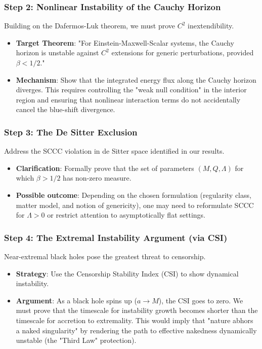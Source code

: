 \documentclass[12pt,a4paper]{article}
\begin{document}
\subsubsection{Step 2: Nonlinear Instability of the Cauchy Horizon}
Building on the Dafermos-Luk theorem, we must prove $C^2$ inextendibility.
\begin{itemize}
    \item \textbf{Target Theorem}: "For Einstein-Maxwell-Scalar systems, the Cauchy horizon is unstable against $C^2$ extensions for generic perturbations, provided $\beta < 1/2$."
    \item \textbf{Mechanism}: Show that the integrated energy flux along the Cauchy horizon diverges. This requires controlling the "weak null condition" in the interior region and ensuring that nonlinear interaction terms do not accidentally cancel the blue-shift divergence.
\end{itemize}

\subsubsection{Step 3: The De Sitter Exclusion}
Address the SCCC violation in de Sitter space identified in our results.
\begin{itemize}
    \item \textbf{Clarification}: Formally prove that the set of parameters $(M, Q, \Lambda)$ for which $\beta > 1/2$ has non-zero measure.
    \item \textbf{Possible outcome}: Depending on the chosen formulation (regularity class, matter model, and notion of genericity), one may need to reformulate SCCC for $\Lambda>0$ or restrict attention to asymptotically flat settings.
\end{itemize}

\subsubsection{Step 4: The Extremal Instability Argument (via CSI)}
Near-extremal black holes pose the greatest threat to censorship.
\begin{itemize}
    \item \textbf{Strategy}: Use the Censorship Stability Index (CSI) to show dynamical instability.
    \item \textbf{Argument}: As a black hole spins up ($a \to M$), the CSI goes to zero. We must prove that the timescale for instability growth becomes shorter than the timescale for accretion to extremality. This would imply that "nature abhors a naked singularity" by rendering the path to effective nakedness dynamically unstable (the "Third Law" protection).
\end{itemize}
\end{document}
